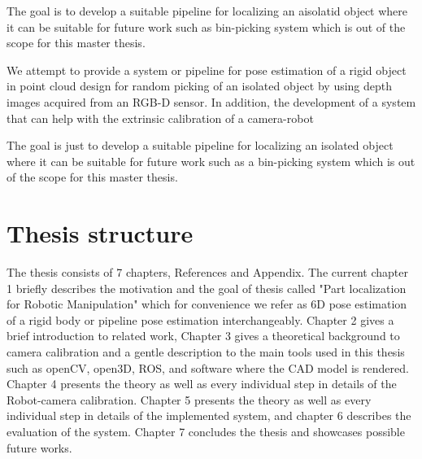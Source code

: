 The goal is to develop a suitable pipeline for localizing an aisolatid object where it can be suitable for future work such as bin-picking system which is out of the scope for this master thesis.
\fi

We attempt to provide a system or pipeline for pose estimation of a rigid object in point cloud design for random picking of an isolated object by using depth images acquired from an RGB-D sensor. In addition, the development of a system that can help with the extrinsic calibration of a camera-robot

The goal is just to develop a suitable pipeline for localizing an isolated object where it can be suitable for future work such as a bin-picking system which is out of the scope for this master thesis.


\section{Thesis structure}

The thesis consists of 7 chapters, References and Appendix. The current chapter 1 briefly describes the motivation and the goal of thesis called "Part localization for Robotic Manipulation" which for convenience we refer as 6D pose estimation of a rigid body or pipeline pose estimation interchangeably. Chapter 2 gives a brief introduction to related work, Chapter 3 gives a theoretical background to camera calibration and a gentle description to the main tools used in this thesis such as openCV, open3D, ROS, and software where the CAD model is rendered. Chapter 4 presents the theory as well as every individual step in details of the Robot-camera calibration. Chapter 5 presents the theory as well as every individual step in details of the implemented system, and chapter 6 describes the evaluation of the system. Chapter 7 concludes the thesis and showcases possible future works.

